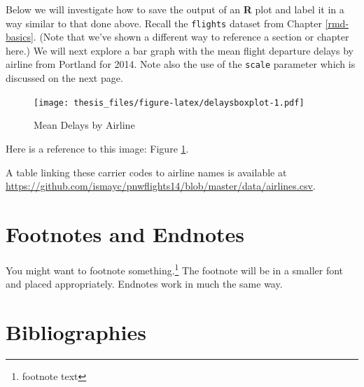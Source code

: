 \documentclass[ms]{uncgdissertationexp}
\newenvironment{Shaded}{\begin{snugshade}}{\end{snugshade}}
\newcommand{\KeywordTok}[1]{\textcolor[rgb]{0.13,0.29,0.53}{\textbf{#1}}}
\newcommand{\DataTypeTok}[1]{\textcolor[rgb]{0.13,0.29,0.53}{#1}}
\newcommand{\StringTok}[1]{\textcolor[rgb]{0.31,0.60,0.02}{#1}}
\newcommand{\OperatorTok}[1]{\textcolor[rgb]{0.81,0.36,0.00}{\textbf{#1}}}
\newcommand{\NormalTok}[1]{#1}
\theoremstyle{plain}
\theoremstyle{definition}
\theoremstyle{remark}
\begin{document}
  \clearpage 
  
  Below we will investigate how to save the output of an \textbf{R} plot
  and label it in a way similar to that done above. Recall the
  \texttt{flights} dataset from Chapter \ref{rmd-basics}. (Note that we've
  shown a different way to reference a section or chapter here.) We will
  next explore a bar graph with the mean flight departure delays by
  airline from Portland for 2014. Note also the use of the \texttt{scale}
  parameter which is discussed on the next page.
  \begin{Shaded}
  \end{Shaded}
  \begin{figure}
  \centering
  \texttt{[image: thesis\_files/figure-latex/delaysboxplot-1.pdf]}
  \caption{\label{fig:delaysboxplot}Mean Delays by Airline}
  \end{figure}
  Here is a reference to this image: Figure \ref{fig:delaysboxplot}.
  
  A table linking these carrier codes to airline names is available at
  \url{https://github.com/ismayc/pnwflights14/blob/master/data/airlines.csv}.
  
  \clearpage
  
  \section{Footnotes and Endnotes}\label{footnotes-and-endnotes}
  
  You might want to footnote something.\footnote{footnote text} The
  footnote will be in a smaller font and placed appropriately. Endnotes
  work in much the same way.
  
  \section{Bibliographies}\label{bibliographies}
  
\end{document}
